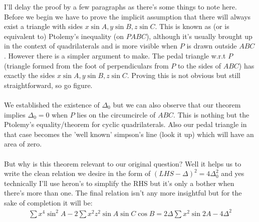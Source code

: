 \documentclass{article}
\begin{document}
I'll delay the proof by a few paragraphs as there's some things to note here. Before we begin we have to prove the implicit assumption that there will always exist a triangle with sides $x\sin A, y\sin B, z\sin C$. This is known as (or is equivalent to) Ptolemy's inequality (on $PABC$), although it's usually brought up in the context of quadrilaterals and is more visible when $P$ is drawn outside $ABC$. However there is a simpler argument to make. The pedal triangle w.r.t $P$ (triangle formed from the foot of perpendiculars from $P$ to the sides of $ABC$) has exactly the sides $x\sin A, y\sin B, z\sin C$. Proving this is not obvious but still straightforward, so go figure.
\\\\
We established the existence of $\Delta_0$ but we can also observe that our theorem implies $\Delta_0 = 0$ when $P$ lies on the circumcircle of $ABC$. This is nothing but the Ptolemy's equality/theorem for cyclic quadrilaterals. Also our pedal triangle in that case becomes the 'well known' simpson's line (look it up) which will have an area of zero.
\\\\
But why is this theorem relevant to our original question? Well it helps us to write the clean relation we desire in the form of $(LHS-\Delta)^2 = 4\Delta_0^2$ and yes technically I'll use heron's to simplify the RHS but it's only a bother when there's more than one. The final relation isn't any more insightful but for the sake of completion it will be:
\begin{align}
    \sum x^4 \sin^2A - 2\sum x^2z^2\sin A\sin C\cos B = 2\Delta\sum x^2\sin 2A - 4\Delta^2
\end{align}
\end{document}
